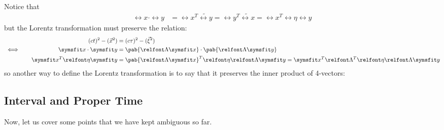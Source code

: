 Notice that
\begin{align}
  \rel{x} \cdot \rel{y} & = \rel{x}^T \tilde{\rel{y}} = \rel{y}^T \tilde{\rel{x}} = \rel{x}^T \rel{\eta} \rel{y}
\end{align}
but the Lorentz transformation must preserve the relation:
\begin{alignat}{2}
   &            & (ct)^2 - (\vec{x}^2)         & = (c\tau)^2 - (\vec{\xi}^2)                                                                                                    \\
   & \iff \quad & \rel{x} \cdot \rel{y}        & = \pab{\rel{\Lambda} \rel{x}} \cdot \pab{\rel{\Lambda} \rel{y}}                                                                \\
   &            & \rel{x}^T \rel{\eta} \rel{y} & =  \pab{\rel{\Lambda} \rel{x}}^T \rel{\eta} \rel{\Lambda} \rel{y} = \rel{x}^T \rel{\Lambda}^T \rel{\eta} \rel{\Lambda} \rel{y}
\end{alignat}
so another way to define the Lorentz transformation is to say that it preserves the inner product of 4-vectors:

\subsection{Interval and Proper Time}
Now, let us cover some points that we have kept ambiguous so far.

